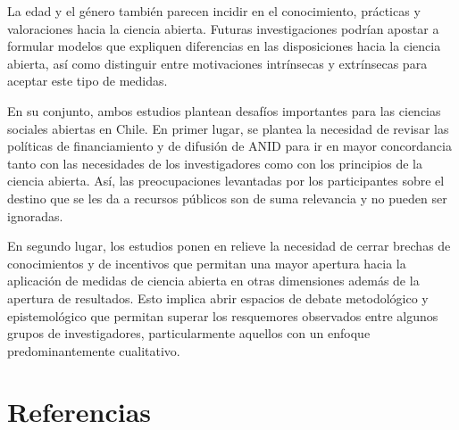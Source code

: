 \documentclass[
  letterpaper,
  DIV=11,
  numbers=noendperiod]{scrreprt}
\begin{document}
La edad y el género también parecen incidir en el conocimiento,
prácticas y valoraciones hacia la ciencia abierta. Futuras
investigaciones podrían apostar a formular modelos que expliquen
diferencias en las disposiciones hacia la ciencia abierta, así como
distinguir entre motivaciones intrínsecas y extrínsecas para aceptar
este tipo de medidas.

En su conjunto, ambos estudios plantean desafíos importantes para las
ciencias sociales abiertas en Chile. En primer lugar, se plantea la
necesidad de revisar las políticas de financiamiento y de difusión de
ANID para ir en mayor concordancia tanto con las necesidades de los
investigadores como con los principios de la ciencia abierta. Así, las
preocupaciones levantadas por los participantes sobre el destino que se
les da a recursos públicos son de suma relevancia y no pueden ser
ignoradas.

En segundo lugar, los estudios ponen en relieve la necesidad de cerrar
brechas de conocimientos y de incentivos que permitan una mayor apertura
hacia la aplicación de medidas de ciencia abierta en otras dimensiones
además de la apertura de resultados. Esto implica abrir espacios de
debate metodológico y epistemológico que permitan superar los
resquemores observados entre algunos grupos de investigadores,
particularmente aquellos con un enfoque predominantemente cualitativo.

\hypertarget{referencias}{%
\chapter*{Referencias}\label{referencias}}
\end{document}
